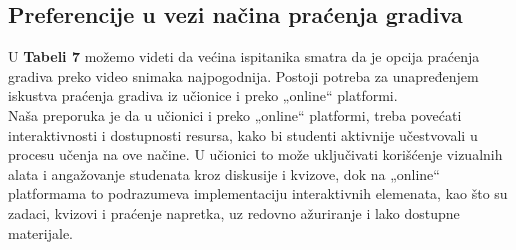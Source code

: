 \documentclass[a4paper]{article}
\begin{document}
\subsection{\textbf{Preferencije u vezi načina praćenja gradiva} }

U \textbf{Tabeli 7} možemo videti da većina ispitanika smatra da je opcija praćenja gradiva preko video snimaka najpogodnija. Postoji potreba za unapređenjem iskustva praćenja gradiva iz učionice i preko „online“ platformi.\\
Naša preporuka je da u učionici i preko „online“ platformi, treba povećati interaktivnosti i dostupnosti resursa, kako bi studenti aktivnije učestvovali u procesu učenja na ove načine. U učionici to može uključivati korišćenje vizualnih alata i angažovanje studenata kroz diskusije i kvizove, dok na „online“ platformama to podrazumeva implementaciju interaktivnih elemenata, kao što su zadaci, kvizovi i praćenje napretka, uz redovno ažuriranje i lako dostupne materijale.\\



\captionsetup[table]{skip=10pt}
\begin{table}[H]
\centering %
\caption{Preferencije u vezi načina praćenja gradiva}
\end{table}

\vspace{0.5cm}  %

\begin{table}[H]
\centering %
\end{table}
\end{document}
